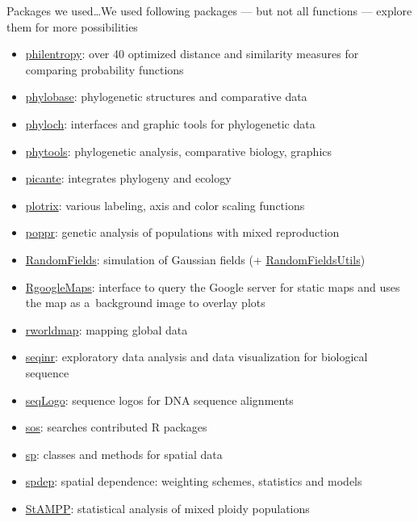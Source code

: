 \documentclass[compress, ucs, xelatex, 11pt, xcolor=svgnames,
  hyperref={
    bookmarks=true,
    unicode=true,
    colorlinks=true,
    pdftitle={Molecular data in R},
    plainpages=false,
    pdfauthor={Vojtech Zeisek},
    pdfsubject={Course about phylogeny and evolution in R},
    pdfcreator={XeLaTeX},
    pdfkeywords={R, evolution, phylogeny, molecular data},
    linkcolor=Tomato,
    anchorcolor=SaddleBrown,
    citecolor=Goldenrod,
    filecolor=DarkMagenta,
    menucolor=Sienna,
    urlcolor=DarkTurquoise,
    pdftex},
  url={hyphens, lowtilde} %
  ]{beamer}
\begin{document}
\begin{frame}[allowframebreaks]{Packages we used\ldots}{We used following packages --- but not all functions --- explore them for more possibilities}
\begin{itemize}
    \item \href{https://CRAN.R-project.org/package=philentropy}{philentropy}: over 40 optimized distance and similarity measures for comparing probability functions
    \item \href{https://CRAN.R-project.org/package=phylobase}{phylobase}: phylogenetic structures and comparative data
    \item \href{http://www.christophheibl.de/Rpackages.html}{phyloch}: interfaces and graphic tools for phylogenetic data
    \item \href{https://CRAN.R-project.org/package=phytools}{phytools}: phylogenetic analysis, comparative biology, graphics
    \item \href{https://CRAN.R-project.org/package=picante}{picante}: integrates phylogeny and ecology
    \item \href{https://CRAN.R-project.org/package=plotrix}{plotrix}: various labeling, axis and color scaling functions
    \item \href{https://CRAN.R-project.org/package=poppr}{poppr}: genetic analysis of populations with mixed reproduction
    \item \href{https://CRAN.R-project.org/package=RandomFields}{RandomFields}: simulation of Gaussian fields (+ \href{https://CRAN.R-project.org/package=RandomFieldsUtils}{RandomFieldsUtils})
    \item \href{https://CRAN.R-project.org/package=RgoogleMaps}{RgoogleMaps}: interface to query the Google server for static maps and uses the map as a~background image to overlay plots
    \item \href{https://CRAN.R-project.org/package=rworldmap}{rworldmap}: mapping global data
    \item \href{https://CRAN.R-project.org/package=seqinr}{seqinr}: exploratory data analysis and data visualization for biological sequence
    \item \href{https://www.bioconductor.org/packages/release/bioc/html/seqLogo.html}{seqLogo}: sequence logos for DNA sequence alignments
    \item \href{https://CRAN.R-project.org/package=sos}{sos}: searches contributed R packages
    \item \href{https://CRAN.R-project.org/package=sp}{sp}: classes and methods for spatial data
    \item \href{https://CRAN.R-project.org/package=spdep}{spdep}: spatial dependence: weighting schemes, statistics and models
    \item \href{https://CRAN.R-project.org/package=StAMPP}{StAMPP}: statistical analysis of mixed ploidy populations

\end{itemize}
\end{frame}
\end{document}
